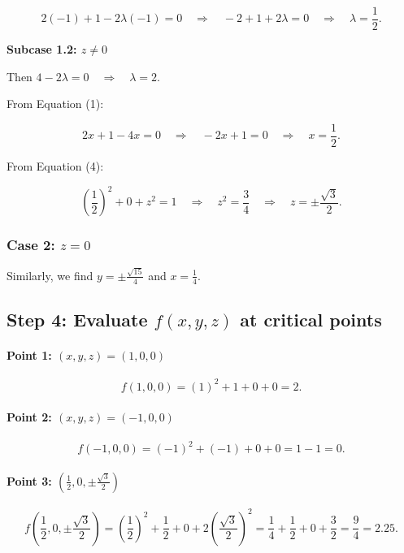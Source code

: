 \documentclass[11pt]{article}
\begin{document}
\[
2(-1) + 1 - 2\lambda (-1) = 0 \quad \Rightarrow \quad -2 + 1 + 2\lambda = 0 \quad \Rightarrow \quad \lambda = \frac{1}{2}.
\]

\textbf{Subcase 1.2: \( z \neq 0 \)}

Then \( 4 - 2\lambda = 0 \quad \Rightarrow \quad \lambda = 2 \).

From Equation (1):

\[
2x + 1 - 4x = 0 \quad \Rightarrow \quad -2x + 1 = 0 \quad \Rightarrow \quad x = \frac{1}{2}.
\]

From Equation (4):

\[
\left( \frac{1}{2} \right)^2 + 0 + z^2 = 1 \quad \Rightarrow \quad z^2 = \frac{3}{4} \quad \Rightarrow \quad z = \pm \frac{\sqrt{3}}{2}.
\]

\newpage

\subsubsection{Case 2: \( z = 0 \)}

Similarly, we find \( y = \pm \frac{\sqrt{15}}{4} \) and \( x = \frac{1}{4} \).

\newpage

\subsection{Step 4: Evaluate \( f(x, y, z) \) at critical points}

\paragraph{Point 1: \( (x, y, z) = (1, 0, 0) \)}

\[
f(1, 0, 0) = (1)^2 + 1 + 0 + 0 = 2.
\]

\paragraph{Point 2: \( (x, y, z) = (-1, 0, 0) \)}

\[
f(-1, 0, 0) = (-1)^2 + (-1) + 0 + 0 = 1 - 1 = 0.
\]

\paragraph{Point 3: \( \left( \frac{1}{2}, 0, \pm \frac{\sqrt{3}}{2} \right) \)}

\[
f\left( \frac{1}{2}, 0, \pm \frac{\sqrt{3}}{2} \right) = \left( \frac{1}{2} \right)^2 + \frac{1}{2} + 0 + 2 \left( \frac{\sqrt{3}}{2} \right)^2 = \frac{1}{4} + \frac{1}{2} + 0 + \frac{3}{2} = \frac{9}{4} = 2.25.
\]
\end{document}
